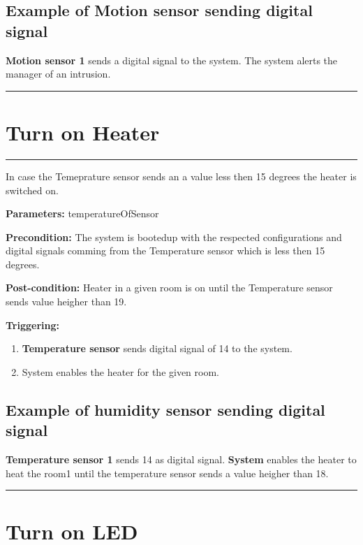 \subsection{Example of Motion sensor sending digital signal}
\textbf{Motion sensor 1} sends a digital signal to the system. The system alerts
the manager of an intrusion.
\hfill
\vspace{0.5cm}
\hrule

\break



\section{Turn on Heater}

\hrule
\hfill
\vspace{0.5cm}
\label{operation:Turn on heater}

In case the Temeprature sensor sends an a value less then 15 degrees the heater
is switched on.
\begin{description}
\item \textbf{Parameters:} temperatureOfSensor
\item \textbf{Precondition:} The system is bootedup with the respected
configurations and digital signals comming from the Temperature sensor which is
less then 15 degrees.
\item \textbf{Post-condition:} Heater in a given room is on until the
Temperature sensor sends value heigher than 19.

\item \textbf{Triggering:}
\begin{enumerate}
\item \textbf{Temperature sensor} sends digital signal of 14 to the system.
\item System enables the heater for the given room.
\end{enumerate}
\end{description}

\subsection{Example of humidity sensor sending digital signal}
\textbf{Temperature sensor 1} sends 14 as digital signal. \textbf{System}
enables the heater to heat the room1 until the temperature sensor sends a value
heigher than 18.
\hfill
\vspace{0.5cm}
\hrule


\section{Turn on LED}

